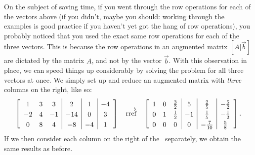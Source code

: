 On the subject of saving time, if you went through the row operations for each of the vectors above (if you didn't, maybe you should: working through the examples is good practice if you haven't yet got the hang of row operations), you probably noticed that you used the exact same row operations for each of the three vectors. This is because the row operations in an augmented matrix $[A|\vec{b}]$ are dictated by the matrix $A$, and not by the vector $\vec{b}$. With this observation in place, we can speed things up considerably by solving the problem for all three vectors at once. We simply set up and reduce an augmented matrix with \textit{three} columns on the right, like so:
\[\extrarowheight=3pt
\left[\begin{array}{ccc|c|c|c}1&3&3&2&1&-4\\ -2&4&-1&-14&0&3\\0&8&4&-8&-4&1 \end{array}\right] \quad \overrightarrow{\text{rref}}\quad \left[\begin{array}{ccc|c|c|c} 1&0&\frac32&5&\frac25 &-\frac52 \\0&1&\frac12&-1&\frac15 &-\frac 12\\0&0&0&0&-\frac{7}{10}&\frac58 \end{array}\right].
\]
If we then consider each column on the right of the \rref\ separately, we obtain the same results as before. %

\medskip



